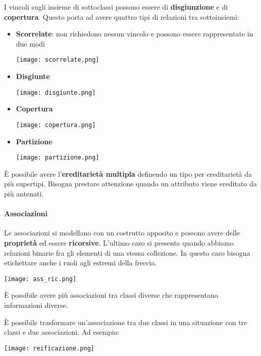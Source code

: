 I vincoli sugli insieme di sottoclassi possono essere di \textbf{disgiunzione} e di \textbf{copertura}. Questo porta ad avere quattro tipi di relazioni tra sottoinsiemi:
\begin{itemize}
	\item \textbf{Scorrelate}: non richiedono nessun vincolo e possono essere rappresentate in due modi
	\begin{center}
		\texttt{[image: scorrelate.png]}
	\end{center}
	\item \textbf{Disgiunte}
	\begin{center}
		\texttt{[image: disgiunte.png]}
	\end{center}
	\item \textbf{Copertura}
	\begin{center}
		\texttt{[image: copertura.png]}
	\end{center}
	\item \textbf{Partizione}
	\begin{center}
		\texttt{[image: partizione.png]}
	\end{center}
\end{itemize}

È possibile avere l'\textbf{ereditarietà multipla} definendo un tipo per ereditarietà da più supertipi. Bisogna prestare attenzione quando un attributo viene ereditato da più antenati.

\paragraph{Associazioni}
Le associazioni si modellano con un costrutto apposito e possono avere delle \textbf{proprietà} ed essere \textbf{ricorsive}. L'ultimo caso si presenta quando abbiamo relazioni binarie fra gli elementi di una stessa collezione. In questo caso bisogna etichettare anche i ruoli agli estremi della freccia.
\begin{center}
	\texttt{[image: ass\_ric.png]}
\end{center}
\begin{note}
	È possibile avere più associazioni tra classi diverse che rappresentano informazioni diverse.
\end{note}

\begin{observation}[Reificazione]
	È possibile trasformare un'associazione tra due classi in una situazione con tre classi e due associazioni. Ad esempio:
	\begin{center}
		\texttt{[image: reificazione.png]}
	\end{center}
\end{observation}

